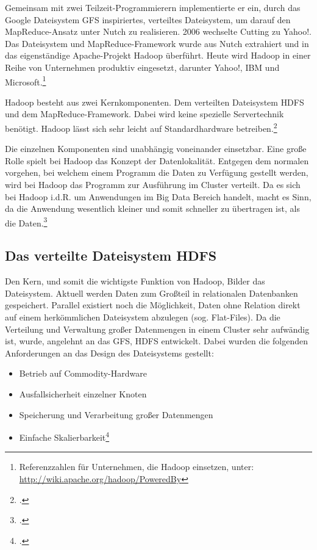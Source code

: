 Gemeinsam mit zwei Teilzeit-Programmierern implementierte er ein, durch das Google Dateisystem \ac{GFS} inspiriertes, verteiltes Dateisystem, um darauf den MapReduce-Ansatz unter Nutch zu realisieren. 2006 wechselte Cutting zu Yahoo!. Das Dateisystem und MapReduce-Framework wurde aus Nutch extrahiert und in das eigenständige Apache-Projekt Hadoop überführt. Heute wird Hadoop in einer Reihe von Unternehmen produktiv eingesetzt, darunter Yahoo!, IBM und Microsoft.\footnote{Referenzzahlen für Unternehmen, die Hadoop einsetzen, unter:\\ \url{http://wiki.apache.org/hadoop/PoweredBy}}

Hadoop besteht aus zwei Kernkomponenten. Dem verteilten Dateisystem \ac{HDFS} und dem MapReduce-Framework. Dabei wird keine spezielle Servertechnik benötigt. Hadoop lässt sich sehr leicht auf Standardhardware betreiben.\footcite[Vgl.][S. 19-22]{Wartala.2012}

Die einzelnen Komponenten sind unabhängig voneinander einsetzbar. Eine große Rolle spielt bei Hadoop das Konzept der Datenlokalität. Entgegen dem normalen vorgehen, bei welchem einem Programm die Daten zu Verfügung gestellt werden, wird bei Hadoop das Programm zur Ausführung im Cluster verteilt. Da es sich bei Hadoop i.d.R. um Anwendungen im Big Data Bereich handelt, macht es Sinn, da die Anwendung wesentlich kleiner und somit schneller zu übertragen ist, als die Daten.\footcite[Vgl.][S. 20]{Freiknecht.2014}

\subsection{Das verteilte Dateisystem HDFS}\label{subsec:DasVerteilteDateisystemHDFS}
Den Kern, und somit die wichtigste Funktion von Hadoop, Bilder das Dateisystem. Aktuell werden Daten zum Großteil in relationalen Datenbanken gespeichert. Parallel existiert noch die Möglichkeit, Daten ohne Relation direkt auf einem herkömmlichen Dateisystem abzulegen (sog. Flat-Files). Da die Verteilung und Verwaltung großer Datenmengen in einem Cluster sehr aufwändig ist, wurde, angelehnt an das \ac{GFS}, \ac{HDFS} entwickelt. Dabei wurden die folgenden Anforderungen an das Design des Dateisystems gestellt:

\begin{itemize}
	\item Betrieb auf \gls{Commodity-Hardware}
	\item Ausfallsicherheit einzelner Knoten
	\item Speicherung und Verarbeitung großer Datenmengen
	\item Einfache Skalierbarkeit\footcite[Vgl.][S. 21]{Freiknecht.2014}
\end{itemize}


